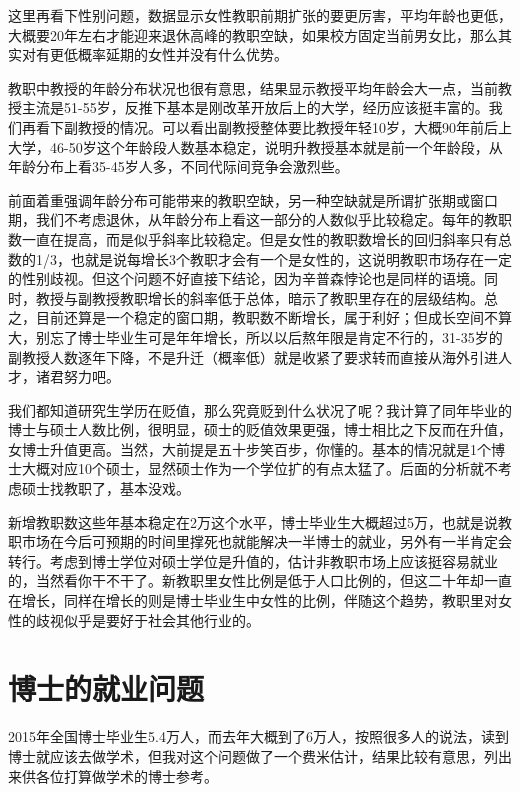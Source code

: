 \documentclass[]{tufte-book}
\begin{document}
这里再看下性别问题，数据显示女性教职前期扩张的要更厉害，平均年龄也更低，大概要20年左右才能迎来退休高峰的教职空缺，如果校方固定当前男女比，那么其实对有更低概率延期的女性并没有什么优势。

教职中教授的年龄分布状况也很有意思，结果显示教授平均年龄会大一点，当前教授主流是51-55岁，反推下基本是刚改革开放后上的大学，经历应该挺丰富的。我们再看下副教授的情况。可以看出副教授整体要比教授年轻10岁，大概90年前后上大学，46-50岁这个年龄段人数基本稳定，说明升教授基本就是前一个年龄段，从年龄分布上看35-45岁人多，不同代际间竞争会激烈些。

前面着重强调年龄分布可能带来的教职空缺，另一种空缺就是所谓扩张期或窗口期，我们不考虑退休，从年龄分布上看这一部分的人数似乎比较稳定。每年的教职数一直在提高，而是似乎斜率比较稳定。但是女性的教职数增长的回归斜率只有总数的1/3，也就是说每增长3个教职才会有一个是女性的，这说明教职市场存在一定的性别歧视。但这个问题不好直接下结论，因为辛普森悖论也是同样的语境。同时，教授与副教授教职增长的斜率低于总体，暗示了教职里存在的层级结构。总之，目前还算是一个稳定的窗口期，教职数不断增长，属于利好；但成长空间不算大，别忘了博士毕业生可是年年增长，所以以后熬年限是肯定不行的，31-35岁的副教授人数逐年下降，不是升迁（概率低）就是收紧了要求转而直接从海外引进人才，诸君努力吧。

我们都知道研究生学历在贬值，那么究竟贬到什么状况了呢？我计算了同年毕业的博士与硕士人数比例，很明显，硕士的贬值效果更强，博士相比之下反而在升值，女博士升值更高。当然，大前提是五十步笑百步，你懂的。基本的情况就是1个博士大概对应10个硕士，显然硕士作为一个学位扩的有点太猛了。后面的分析就不考虑硕士找教职了，基本没戏。

新增教职数这些年基本稳定在2万这个水平，博士毕业生大概超过5万，也就是说教职市场在今后可预期的时间里撑死也就能解决一半博士的就业，另外有一半肯定会转行。考虑到博士学位对硕士学位是升值的，估计非教职市场上应该挺容易就业的，当然看你干不干了。新教职里女性比例是低于人口比例的，但这二十年却一直在增长，同样在增长的则是博士毕业生中女性的比例，伴随这个趋势，教职里对女性的歧视似乎是要好于社会其他行业的。

\hypertarget{ux535aux58ebux7684ux5c31ux4e1aux95eeux9898}{%
\section{博士的就业问题}\label{ux535aux58ebux7684ux5c31ux4e1aux95eeux9898}}

2015年全国博士毕业生5.4万人，而去年大概到了6万人，按照很多人的说法，读到博士就应该去做学术，但我对这个问题做了一个费米估计，结果比较有意思，列出来供各位打算做学术的博士参考。
\end{document}
